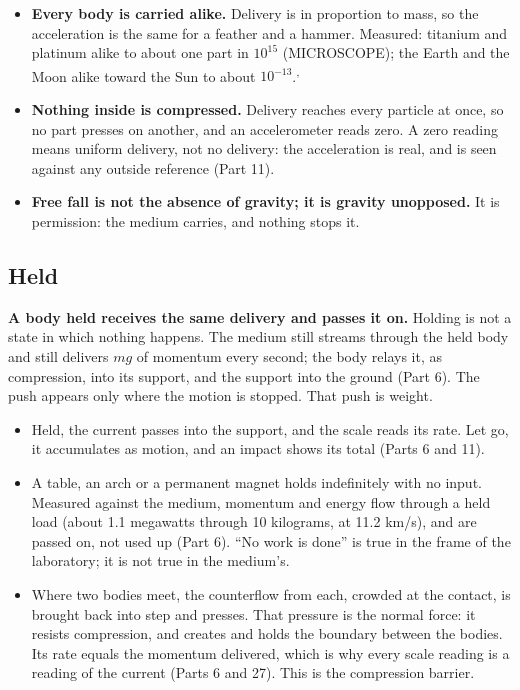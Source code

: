 \begin{itemize}
\item \textbf{Every body is carried alike.} Delivery is in proportion to mass, so the acceleration is the same for a feather and a hammer. Measured: titanium and platinum alike to about one part in $10^{15}$ (MICROSCOPE); the Earth and the Moon alike toward the Sun to about $10^{-13}$.\textsuperscript{,}
\item \textbf{Nothing inside is compressed.} Delivery reaches every particle at once, so no part presses on another, and an accelerometer reads zero. A zero reading means uniform delivery, not no delivery: the acceleration is real, and is seen against any outside reference (Part 11).
\item \textbf{Free fall is not the absence of gravity; it is gravity unopposed.} It is permission: the medium carries, and nothing stops it.
\end{itemize}

\subsection{Held}

\begin{hypbar}
\textbf{A body held receives the same delivery and passes it on.} Holding is not a state in which nothing happens. The medium still streams through the held body and still delivers $mg$ of momentum every second; the body relays it, as compression, into its support, and the support into the ground (Part 6).\footnotemark{} The push appears only where the motion is stopped. That push is weight.
\end{hypbar}

\begin{itemize}
\item {} Held, the current passes into the support, and the scale reads its rate. Let go, it accumulates as motion, and an impact shows its total (Parts 6 and 11).
\item {} A table, an arch or a permanent magnet holds indefinitely with no input. Measured against the medium, momentum and energy flow through a held load (about 1.1 megawatts through 10 kilograms, at 11.2 km/s), and are passed on, not used up (Part 6). ``No work is done'' is true in the frame of the laboratory; it is not true in the medium's.
\item {} Where two bodies meet, the counterflow from each, crowded at the contact, is brought back into step and presses. That pressure is the normal force: it resists compression, and creates and holds the boundary between the bodies. Its rate equals the momentum delivered, which is why every scale reading is a reading of the current (Parts 6 and 27). This is the compression barrier.
\end{itemize}

